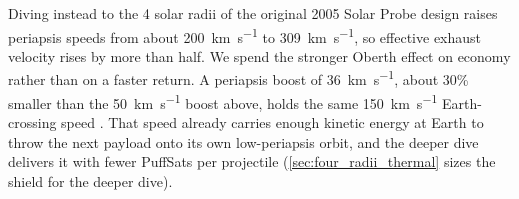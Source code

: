 \documentclass{article}
\begin{document}
Diving instead to the 4 solar radii of the original 2005 Solar Probe design \cite{mccomas2005solar} raises periapsis speeds from about \SI{200}{\kilo\meter\per\second} to \SI{309}{\kilo\meter\per\second}, so effective exhaust velocity rises by more than half. We spend the stronger Oberth effect on economy rather than on a faster return. A periapsis boost of \SI{36}{\kilo\meter\per\second}, about 30\% smaller than the \SI{50}{\kilo\meter\per\second} boost above, holds the same \SI{150}{\kilo\meter\per\second} Earth-crossing speed \cite{Katz_aim_is_all_you_need_2025}. That speed already carries enough kinetic energy at Earth to throw the next payload onto its own low-periapsis orbit, and the deeper dive delivers it with fewer PuffSats per projectile (\autoref{sec:four_radii_thermal} sizes the shield for the deeper dive).
\end{document}
